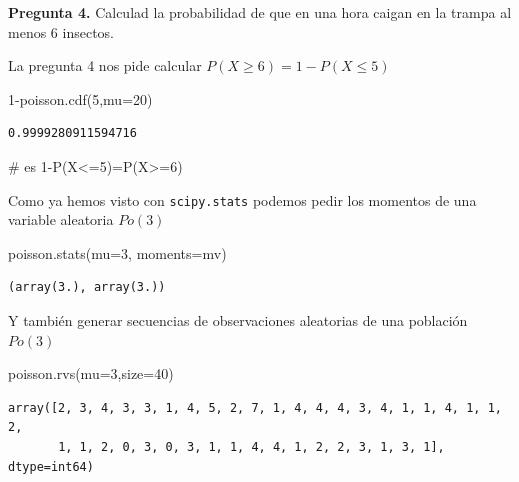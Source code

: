 \documentclass[
  letterpaper,
  DIV=11,
  numbers=noendperiod]{scrreprt}
\newenvironment{Shaded}{\begin{snugshade}}{\end{snugshade}}
\newcommand{\CommentTok}[1]{\textcolor[rgb]{0.37,0.37,0.37}{#1}}
\newcommand{\DecValTok}[1]{\textcolor[rgb]{0.68,0.00,0.00}{#1}}
\newcommand{\NormalTok}[1]{\textcolor[rgb]{0.00,0.23,0.31}{#1}}
\newcommand{\OperatorTok}[1]{\textcolor[rgb]{0.37,0.37,0.37}{#1}}
\newcommand{\StringTok}[1]{\textcolor[rgb]{0.13,0.47,0.30}{#1}}
\begin{document}
\textbf{Pregunta 4.} Calculad la probabilidad de que en una hora caigan
en la trampa al menos 6 insectos.

La pregunta 4 nos pide calcular \(P(X\geq 6)=1-P(X\leq 5)\)

\begin{Shaded}
\begin{Highlighting}[]
\DecValTok{1}\OperatorTok{{-}}\NormalTok{poisson.cdf(}\DecValTok{5}\NormalTok{,mu}\OperatorTok{=}\DecValTok{20}\NormalTok{) }
\end{Highlighting}
\end{Shaded}

\begin{verbatim}
0.9999280911594716
\end{verbatim}

\begin{Shaded}
\begin{Highlighting}[]
\CommentTok{\# es 1{-}P(X\textless{}=5)=P(X\textgreater{}=6)}
\end{Highlighting}
\end{Shaded}

Como ya hemos visto con \texttt{scipy.stats} podemos pedir los momentos
de una variable aleatoria \(Po(3)\)

\begin{Shaded}
\begin{Highlighting}[]
\NormalTok{poisson.stats(mu}\OperatorTok{=}\DecValTok{3}\NormalTok{, moments}\OperatorTok{=}\StringTok{\textquotesingle{}mv\textquotesingle{}}\NormalTok{)}
\end{Highlighting}
\end{Shaded}

\begin{verbatim}
(array(3.), array(3.))
\end{verbatim}

Y también generar secuencias de observaciones aleatorias de una
población \(Po(3)\)

\begin{Shaded}
\begin{Highlighting}[]
\NormalTok{poisson.rvs(mu}\OperatorTok{=}\DecValTok{3}\NormalTok{,size}\OperatorTok{=}\DecValTok{40}\NormalTok{)}
\end{Highlighting}
\end{Shaded}

\begin{verbatim}
array([2, 3, 4, 3, 3, 1, 4, 5, 2, 7, 1, 4, 4, 4, 3, 4, 1, 1, 4, 1, 1, 2,
       1, 1, 2, 0, 3, 0, 3, 1, 1, 4, 4, 1, 2, 2, 3, 1, 3, 1], dtype=int64)
\end{verbatim}
\end{document}
